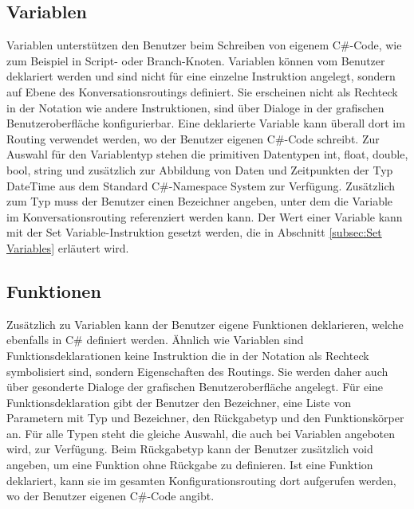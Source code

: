 \subsection{Variablen}
\label{subsec:Variablen}
Variablen unterstützen den Benutzer beim Schreiben von eigenem C\#-Code, wie zum Beispiel in Script- oder Branch-Knoten. Variablen können vom Benutzer deklariert werden und sind nicht für eine einzelne Instruktion angelegt, sondern auf Ebene des Konversationsroutings definiert. Sie erscheinen nicht als Rechteck in der Notation wie andere Instruktionen, sind über Dialoge in der grafischen Benutzeroberfläche konfigurierbar. Eine deklarierte Variable kann überall dort im Routing verwendet werden, wo der Benutzer eigenen C\#-Code schreibt. Zur Auswahl für den Variablentyp stehen die primitiven Datentypen int, float, double, bool, string und zusätzlich zur Abbildung von Daten und Zeitpunkten der Typ DateTime aus dem Standard C\#-Namespace System zur Verfügung. Zusätzlich zum Typ muss der Benutzer einen Bezeichner angeben, unter dem die Variable im Konversationsrouting referenziert werden kann. Der Wert einer Variable kann mit der Set Variable-Instruktion gesetzt werden, die in Abschnitt \ref{subsec:Set Variables} erläutert wird. 

\subsection{Funktionen}
Zusätzlich zu Variablen kann der Benutzer eigene Funktionen deklarieren, welche ebenfalls in C\# definiert werden. Ähnlich wie Variablen sind Funktionsdeklarationen keine Instruktion die in der Notation als Rechteck symbolisiert sind, sondern Eigenschaften des Routings. Sie werden daher auch über gesonderte Dialoge der grafischen Benutzeroberfläche angelegt. Für eine Funktionsdeklaration gibt der Benutzer den Bezeichner, eine Liste von Parametern mit Typ und Bezeichner, den Rückgabetyp und den Funktionskörper an. Für alle Typen steht die gleiche Auswahl, die auch bei Variablen angeboten wird, zur Verfügung. Beim Rückgabetyp kann der Benutzer zusätzlich void angeben, um eine Funktion ohne Rückgabe zu definieren. Ist eine Funktion deklariert, kann sie im gesamten Konfigurationsrouting dort aufgerufen werden, wo der Benutzer eigenen C\#-Code angibt.  

